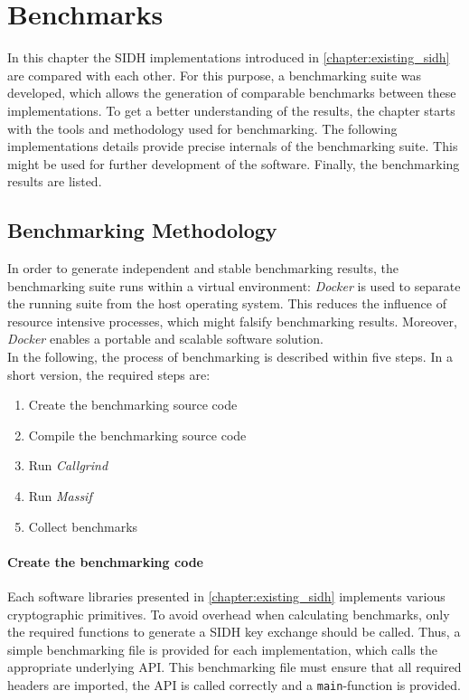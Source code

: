 \chapter{Benchmarks}\label{chapter:benchmarks}
In this chapter the SIDH implementations introduced in \autoref{chapter:existing_sidh} are compared with each other. For this purpose, a benchmarking suite was developed, which allows the generation of comparable benchmarks between these implementations. To get a better understanding of the results, the chapter starts with the tools and methodology used for benchmarking. The following implementations details provide precise internals of the benchmarking suite. This might be used for further development of the software. Finally, the benchmarking results are listed.
\section{Benchmarking Methodology}
In order to generate independent and stable benchmarking results, the benchmarking suite runs within a virtual environment: \textit{Docker} is used to separate the running suite from the host operating system. This reduces the influence of resource intensive processes, which might falsify benchmarking results. Moreover, \textit{Docker} enables a portable and scalable software solution.
\\
In the following, the process of benchmarking is described within five steps. In a short version, the required steps are:

\begin{enumerate}
  \item Create the benchmarking source code
  \item Compile the benchmarking source code
  \item Run \textit{Callgrind}
  \item Run \textit{Massif}
  \item Collect benchmarks
\end{enumerate}

\subsubsection{Create the benchmarking code}
Each software libraries presented in \autoref{chapter:existing_sidh} implements various cryptographic primitives. To avoid overhead when calculating benchmarks, only the required functions to generate a SIDH key exchange should be called. Thus, a simple benchmarking file is provided for each implementation, which calls the appropriate underlying API. This benchmarking file must ensure that all required headers are imported, the API is called correctly and a \texttt{main}-function is provided.

